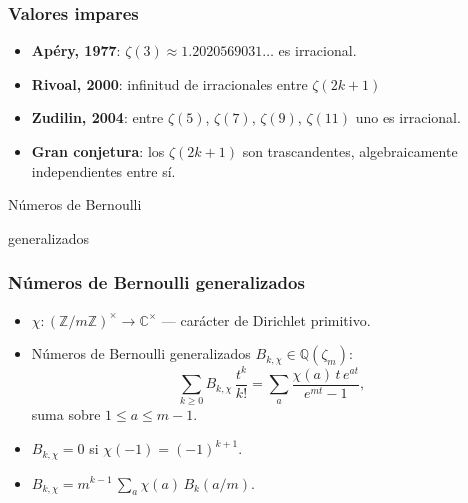 \documentclass{beamer}
\newcommand{\ZZ}{\mathbb{Z}}
\newcommand{\QQ}{\mathbb{Q}}
\newcommand{\CC}{\mathbb{C}}
\begin{document}

\begin{frame}
  \frametitle{Valores impares}

  \begin{itemize}
  \item<1-> \textbf{Apéry, 1977}:
    $\zeta (3) \approx 1.2020569031\ldots$
    es irracional.

  \item<2-> \textbf{Rivoal, 2000}:
    infinitud de irracionales entre $\zeta (2k+1)$

  \item<3-> \textbf{Zudilin, 2004}:
    entre $\zeta(5)$, $\zeta(7)$, $\zeta(9)$, $\zeta(11)$ uno es irracional.

  \item<4-> \textbf{Gran conjetura}: los $\zeta (2k+1)$ son trascandentes,
    algebraicamente independientes entre sí.
  \end{itemize}
\end{frame}


\begin{frame}[plain]
  \headingfont

  \begin{center}
    {\huge Números de Bernoulli

      generalizados

    }
  \end{center}
\end{frame}


\begin{frame}
  \frametitle{Números de Bernoulli generalizados}

  \begin{itemize}
  \item<1-> $\chi\colon (\ZZ/m\ZZ)^\times \to \CC^\times$ --- carácter de Dirichlet primitivo.

  \item<2-> Números de Bernoulli generalizados $B_{k,\chi} \in \QQ (\zeta_m)$:
    $$\sum_{k\ge 0} B_{k,\chi}\,\frac{t^k}{k!} = \sum_a \frac{\chi (a)\,t\,e^{at}}{e^{mt} - 1},$$
    suma sobre $1 \le a \le m-1$.
  \end{itemize}

  \begin{itemize}
  \item<3-> $B_{k,\chi} = 0$ si $\chi (-1) = (-1)^{k+1}$.

  \item<4-> $B_{k,\chi} = m^{k-1} \, \sum_a \chi (a)\,B_k (a/m)$.
  \end{itemize}
\end{frame}
\end{document}
